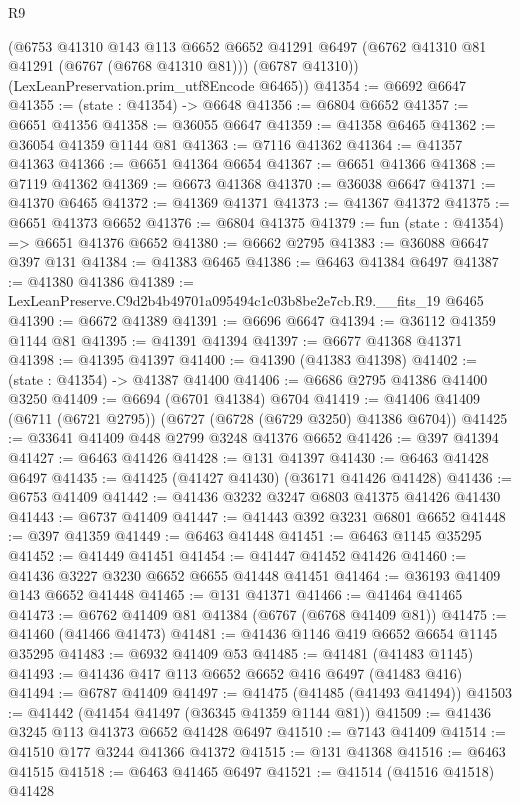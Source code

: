 \begin{lexlean}{R9}
\begin{coremodule}
      (@6753
        @41310
        @143
        @113
        @6652
        @6652
        @41291
        @6497
        (@6762 @41310 @81 @41291 (@6767 (@6768 @41310 @81)))
        (@6787 @41310))
      (LexLeanPreservation.prim_utf8Encode @6465))
@41354 := @6692 @6647
@41355 := (state : @41354) -> @6648
@41356 := @6804 @6652
@41357 := @6651 @41356
@41358 := @36055 @6647
@41359 := @41358 @6465
@41362 := @36054 @41359 @1144 @81
@41363 := @7116 @41362
@41364 := @41357 @41363
@41366 := @6651 @41364 @6654
@41367 := @6651 @41366
@41368 := @7119 @41362
@41369 := @6673 @41368
@41370 := @36038 @6647
@41371 := @41370 @6465
@41372 := @41369 @41371
@41373 := @41367 @41372
@41375 := @6651 @41373 @6652
@41376 := @6804 @41375
@41379 := fun (state : @41354) => @6651 @41376 @6652
@41380 := @6662 @2795
@41383 := @36088 @6647 @397 @131
@41384 := @41383 @6465
@41386 := @6463 @41384 @6497
@41387 := @41380 @41386
@41389 := LexLeanPreserve.C9d2b4b49701a095494c1c03b8be2e7cb.R9.__fits_19 @6465
@41390 := @6672 @41389
@41391 := @6696 @6647
@41394 := @36112 @41359 @1144 @81
@41395 := @41391 @41394
@41397 := @6677 @41368 @41371
@41398 := @41395 @41397
@41400 := @41390 (@41383 @41398)
@41402 := (state : @41354) -> @41387 @41400
@41406 := @6686 @2795 @41386 @41400 @3250
@41409 := @6694 (@6701 @41384) @6704
@41419 := @41406 @41409 (@6711 (@6721 @2795)) (@6727 (@6728 (@6729 @3250) @41386 @6704))
@41425 := @33641 @41409 @448 @2799 @3248 @41376 @6652
@41426 := @397 @41394
@41427 := @6463 @41426
@41428 := @131 @41397
@41430 := @6463 @41428 @6497
@41435 := @41425 (@41427 @41430) (@36171 @41426 @41428)
@41436 := @6753 @41409
@41442 := @41436 @3232 @3247 @6803 @41375 @41426 @41430
@41443 := @6737 @41409
@41447 := @41443 @392 @3231 @6801 @6652
@41448 := @397 @41359
@41449 := @6463 @41448
@41451 := @6463 @1145 @35295
@41452 := @41449 @41451
@41454 := @41447 @41452 @41426
@41460 := @41436 @3227 @3230 @6652 @6655 @41448 @41451
@41464 := @36193 @41409 @143 @6652 @41448
@41465 := @131 @41371
@41466 := @41464 @41465
@41473 := @6762 @41409 @81 @41384 (@6767 (@6768 @41409 @81))
@41475 := @41460 (@41466 @41473)
@41481 := @41436 @1146 @419 @6652 @6654 @1145 @35295
@41483 := @6932 @41409 @53
@41485 := @41481 (@41483 @1145)
@41493 := @41436 @417 @113 @6652 @6652 @416 @6497 (@41483 @416)
@41494 := @6787 @41409
@41497 := @41475 (@41485 (@41493 @41494))
@41503 := @41442 (@41454 @41497 (@36345 @41359 @1144 @81))
@41509 := @41436 @3245 @113 @41373 @6652 @41428 @6497
@41510 := @7143 @41409
@41514 := @41510 @177 @3244 @41366 @41372
@41515 := @131 @41368
@41516 := @6463 @41515
@41518 := @6463 @41465 @6497
@41521 := @41514 (@41516 @41518) @41428

\end{coremodule}
\end{lexlean}
